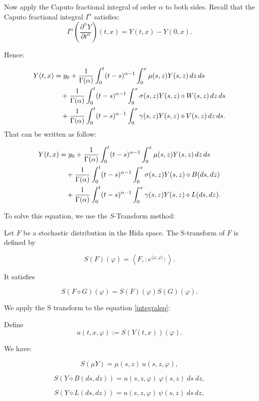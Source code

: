 \documentclass[12pt]{article}%
\numberwithin{equation}{section}
\begin{document}
Now apply the Caputo fractional integral of order $\alpha$ to both sides. Recall that the Caputo fractional integral $I^\alpha$ satisfies:
 \begin{equation}
I^\alpha \left( \frac{\partial^\alpha Y}{\partial t^\alpha} \right)(t,x) = Y(t,x) - Y(0,x).
\end{equation}
 
Hence:

\begin{align}
Y(t,x) &= y_0 + \frac{1}{\Gamma(\alpha)} \int_0^t (t-s)^{\alpha-1} \int_0^x \mu(s,z) Y(s,z) \, dz \, ds \notag \\
&\quad + \frac{1}{\Gamma(\alpha)} \int_0^t (t-s)^{\alpha-1} \int_0^x \sigma(s,z) Y(s,z) \diamond W(s,z) \, dz \, ds \notag \\
&\quad + \frac{1}{\Gamma(\alpha)} \int_0^t (t-s)^{\alpha-1} \int_0^x \gamma(s,z) Y(s,z) \diamond V(s,z) \, dz \, ds.
\end{align}   
That can be written as follow:

\begin{align}\label{integraleq}
Y(t,x) &= y_0 + \frac{1}{\Gamma(\alpha)} \int_0^t (t-s)^{\alpha-1} \int_0^x \mu(s,z) Y(s,z) \, dz \, ds \notag \\
&\quad + \frac{1}{\Gamma(\alpha)} \int_0^t (t-s)^{\alpha-1} \int_0^x \sigma(s,z) Y(s,z) \diamond B(ds, dz) \notag \\
&\quad + \frac{1}{\Gamma(\alpha)} \int_0^t (t-s)^{\alpha-1} \int_0^x \gamma(s,z) Y(s,z) \diamond L(ds, dz).
\end{align}


To solve this equation, we use the $S$-Transform method:


Let $F$ be a stochastic distribution in the Hida space. The S-transform of $F$ is defined by

\[
S(F)(\varphi) = \left\langle F , :e^{\langle \omega, \varphi \rangle}:\right\rangle.
\]

It satisfies

\[
S(F \diamond G)(\varphi) = S(F)(\varphi) S(G)(\varphi).
\]

We apply the S transform  to the equation \eqref{integraleq}:

Define
\[
u(t,x,\varphi) := S(Y(t,x))(\varphi).
\]

We have:

\[
S(\mu Y) = \mu(s,z)\ u(s,z,\varphi),
\]

\[
S(Y \diamond B(ds,dz)) = u(s,z,\varphi)\  \varphi(s,z)\ ds\ dz,
\]

\[
S(Y \diamond L(ds,dz)) = u(s,z,\varphi)\ \psi(s,z)\ ds\ dz,
\]
\end{document}
